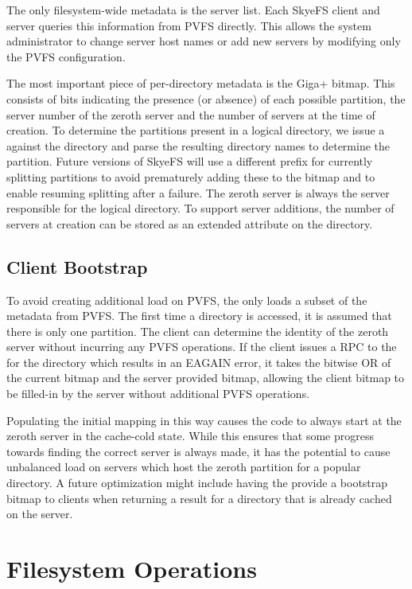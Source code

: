 \documentclass[onecolumn, 11pt, letterpaper]{article}
\begin{document}
The only filesystem-wide metadata is the server list.  Each SkyeFS client and
server queries this information from PVFS directly.  This allows the system
administrator to change server host names or add new servers by modifying only
the PVFS configuration.

The most important piece of per-directory metadata is the Giga+ bitmap.  This
consists of bits indicating the presence (or absence) of each possible
partition, the server number of the zeroth server and  the number of servers
at the time of creation.  To determine the partitions present in a logical
directory, we issue a
 against the directory and parse the resulting directory names
to determine the partition.  Future versions of SkyeFS will use a
different prefix for currently splitting partitions to avoid prematurely
adding these to the bitmap and to enable resuming splitting after a failure.
The zeroth server is always the server responsible for the logical directory.
To support server additions, the number of servers at creation can be stored
as an extended attribute on the directory.

\subsection{Client Bootstrap}
To avoid creating additional load on PVFS, the  only loads
a subset of the metadata from PVFS.  The first time a directory is accessed,
it is assumed that there is only one partition.  The client can determine
the identity of the zeroth server without incurring any PVFS operations.  If the client
issues a RPC to the  for the directory which results in an
EAGAIN error, it takes the bitwise OR of the current bitmap and the server
provided bitmap, allowing the client bitmap to be filled-in by the server
without additional PVFS operations.

Populating the initial mapping in this way causes the  code to
always start at the zeroth server in the cache-cold state.  While this
ensures that some progress towards finding the correct server is always made,
it has the potential to cause unbalanced load on servers which host the zeroth
partition for a popular directory.  A future optimization might include having
the  provide a bootstrap bitmap to clients when returning a
 result for a directory that is already cached on the server.

\section{Filesystem Operations}
\end{document}

